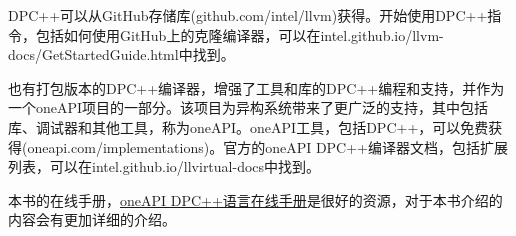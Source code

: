 DPC++可以从GitHub存储库(github.com/intel/llvm)获得。开始使用DPC++指令，包括如何使用GitHub上的克隆编译器，可以在intel.github.io/llvm-docs/GetStartedGuide.html中找到。\par

也有打包版本的DPC++编译器，增强了工具和库的DPC++编程和支持，并作为一个oneAPI项目的一部分。该项目为异构系统带来了更广泛的支持，其中包括库、调试器和其他工具，称为oneAPI。oneAPI工具，包括DPC++，可以免费获得(oneapi.com/implementations)。官方的oneAPI DPC++编译器文档，包括扩展列表，可以在intel.github.io/llvirtual-docs中找到。\par

\begin{tcolorbox}[colback=red!5!white,colframe=red!75!black]
本书的在线手册，\href{https://docs.oneapi.com/versions/latest/dpcpp/index.html}{oneAPI DPC++语言在线手册}是很好的资源，对于本书介绍的内容会有更加详细的介绍。
\end{tcolorbox}